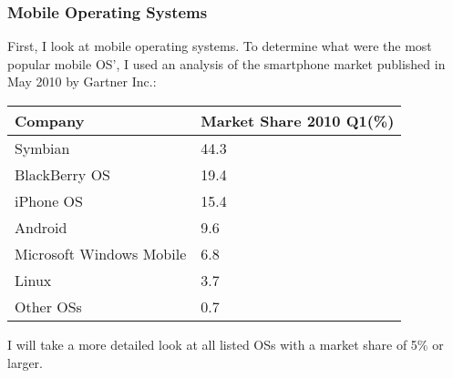 \subsubsection{Mobile Operating Systems}
First, I look at mobile operating systems. To determine what were the most popular mobile OS', I used an analysis of the smartphone market published in May 2010 by Gartner Inc.\cite{gartner:mobile}:

\begin{tabular}{l l}
Company & Market Share 2010 Q1(\%) \\
\hline
Symbian & 44.3 \\
BlackBerry OS & 19.4 \\
iPhone OS & 15.4 \\
Android & 9.6 \\
Microsoft Windows Mobile & 6.8 \\
Linux & 3.7 \\
Other OSs & 0.7 \\
\end{tabular}

I will take a more detailed look at all listed OSs with a market share of 5\% or larger. 

